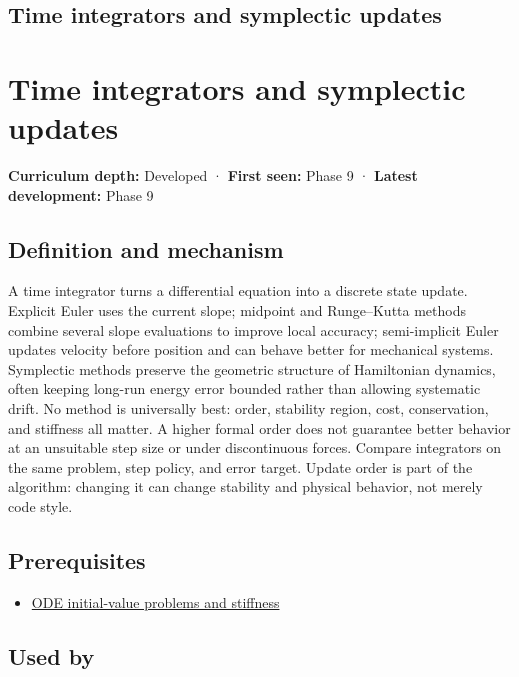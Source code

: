 \hypertarget{appendix-8f96f9c4d5bc}{}
\section*{Time integrators and symplectic updates}
\chapter{Time integrators and symplectic updates}\label{appendix-8f96f9c4d5bc-time-integrators-and-symplectic-updates}

\textbf{Curriculum depth:} Developed · \textbf{First seen:} Phase 9 · \textbf{Latest development:} Phase 9

\section{Definition and mechanism}\label{appendix-8f96f9c4d5bc-definition-and-mechanism}

A time integrator turns a differential equation into a discrete state update. Explicit Euler uses the current slope; midpoint and Runge--Kutta methods combine several slope evaluations to improve local accuracy; semi-implicit Euler updates velocity before position and can behave better for mechanical systems. Symplectic methods preserve the geometric structure of Hamiltonian dynamics, often keeping long-run energy error bounded rather than allowing systematic drift. No method is universally best: order, stability region, cost, conservation, and stiffness all matter. A higher formal order does not guarantee better behavior at an unsuitable step size or under discontinuous forces. Compare integrators on the same problem, step policy, and error target. Update order is part of the algorithm: changing it can change stability and physical behavior, not merely code style.

\section{Prerequisites}\label{appendix-8f96f9c4d5bc-prerequisites}

\begin{itemize}
\tightlist
\item
  \hyperref[appendix-e8ab9836882e]{ODE initial-value problems and stiffness}
\end{itemize}

\section{Used by}\label{appendix-8f96f9c4d5bc-used-by}

